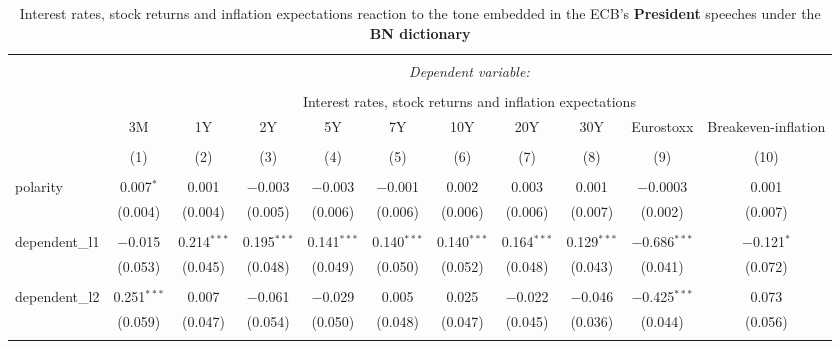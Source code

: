 
\begin{table}[!htbp] \centering 
  \caption[BN Tone \& Interest Rates, Stock Returns, Inflation Expectations: president speeches]{Interest rates, stock returns and inflation expectations reaction to the tone embedded in the ECB's \textbf{President} speeches under the \textbf{BN dictionary}} 
  \label{tab:assets_president_bn} 
  \begin{adjustbox}{width=1.25\textwidth}
\begin{tabular}{@{\extracolsep{5pt}}lcccccccccc} 
\\[-1.8ex]\hline 
\hline \\[-1.8ex] 
 & \multicolumn{10}{c}{\textit{Dependent variable:}} \\ 
\cline{2-11} 
\\[-1.8ex] & \multicolumn{10}{c}{Interest rates, stock returns and inflation expectations} \\ 
 & 3M & 1Y & 2Y & 5Y & 7Y & 10Y & 20Y & 30Y & Eurostoxx & Breakeven-inflation \\ 
\\[-1.8ex] & (1) & (2) & (3) & (4) & (5) & (6) & (7) & (8) & (9) & (10)\\ 
\hline \\[-1.8ex] 
 polarity & 0.007$^{*}$ & 0.001 & $-$0.003 & $-$0.003 & $-$0.001 & 0.002 & 0.003 & 0.001 & $-$0.0003 & 0.001 \\ 
  & (0.004) & (0.004) & (0.005) & (0.006) & (0.006) & (0.006) & (0.006) & (0.007) & (0.002) & (0.007) \\ 
  & & & & & & & & & & \\ 
 dependent\_l1 & $-$0.015 & 0.214$^{***}$ & 0.195$^{***}$ & 0.141$^{***}$ & 0.140$^{***}$ & 0.140$^{***}$ & 0.164$^{***}$ & 0.129$^{***}$ & $-$0.686$^{***}$ & $-$0.121$^{*}$ \\ 
  & (0.053) & (0.045) & (0.048) & (0.049) & (0.050) & (0.052) & (0.048) & (0.043) & (0.041) & (0.072) \\ 
  & & & & & & & & & & \\ 
 dependent\_l2 & 0.251$^{***}$ & 0.007 & $-$0.061 & $-$0.029 & 0.005 & 0.025 & $-$0.022 & $-$0.046 & $-$0.425$^{***}$ & 0.073 \\ 
  & (0.059) & (0.047) & (0.054) & (0.050) & (0.048) & (0.047) & (0.045) & (0.036) & (0.044) & (0.056) \\ 
  & & & & & & & & & & \\ 

\end{tabular}
\end{adjustbox}
\end{table}
